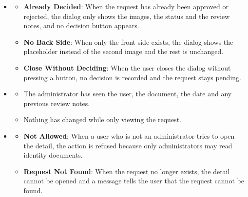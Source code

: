 \begin{itemize}[leftmargin=1.6em,topsep=4pt,itemsep=3pt,parsep=0pt,label=$\bullet$]
\begin{itemize}[leftmargin=2.2em,topsep=2pt,itemsep=3pt,parsep=0pt,label=$\circ$]
            \item \textbf{Decide on a Pending Request}: When the request is pending, the dialog also shows a review notes box and the \textbf{Approve} and \textbf{Reject} buttons (see \textbf{Approve or Reject ID Verification}).
            \item \textbf{Close the Detail}: The user closes the dialog and returns to the list, where the row reflects the current status.
        \end{itemize}
    \item {}
        \begin{itemize}[leftmargin=2.2em,topsep=2pt,itemsep=3pt,parsep=0pt,label=$\circ$]
            \item \textbf{Already Decided}: When the request has already been approved or rejected, the dialog only shows the images, the status and the review notes, and no decision button appears.
            \item \textbf{No Back Side}: When only the front side exists, the dialog shows the placeholder instead of the second image and the rest is unchanged.
            \item \textbf{Close Without Deciding}: When the user closes the dialog without pressing a button, no decision is recorded and the request stays pending.
        \end{itemize}
    \item {}
        \begin{itemize}[leftmargin=2.2em,topsep=2pt,itemsep=3pt,parsep=0pt,label=$\circ$]
            \item The administrator has seen the user, the document, the date and any previous review notes.
            \item Nothing has changed while only viewing the request.
        \end{itemize}
    \item {}
        \begin{itemize}[leftmargin=2.2em,topsep=2pt,itemsep=3pt,parsep=0pt,label=$\circ$]
            \item \textbf{Not Allowed}: When a user who is not an administrator tries to open the detail, the action is refused because only administrators may read identity documents.
            \item \textbf{Request Not Found}: When the request no longer exists, the detail cannot be opened and a message tells the user that the request cannot be found.

\end{itemize}
\end{itemize}
